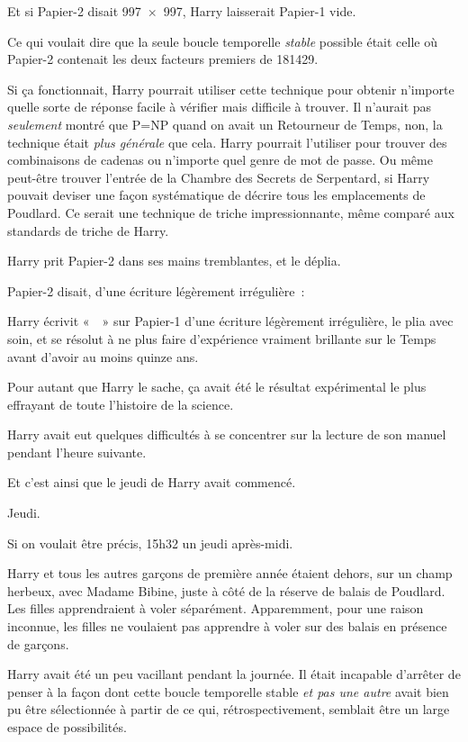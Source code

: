 Et si Papier-2 disait 997~$\times$~997, Harry laisserait Papier-1 vide.

Ce qui voulait dire que la seule boucle temporelle \emph{stable} possible était celle où Papier-2 contenait les deux facteurs premiers de 181429.

Si ça fonctionnait, Harry pourrait utiliser cette technique pour obtenir n'importe quelle sorte de réponse facile à vérifier mais difficile à trouver. Il n'aurait pas \emph{seulement} montré que P=NP quand on avait un Retourneur de Temps, non, la technique était \emph{plus générale} que cela. Harry pourrait l'utiliser pour trouver des combinaisons de cadenas ou n'importe quel genre de mot de passe. Ou même peut-être trouver l'entrée de la Chambre des Secrets de Serpentard, si Harry pouvait deviser une façon systématique de décrire tous les emplacements de Poudlard. Ce serait une technique de triche impressionnante, même comparé aux standards de triche de Harry.

Harry prit Papier-2 dans ses mains tremblantes, et le déplia.

Papier-2 disait, d'une écriture légèrement irrégulière~:


Harry écrivit «~~» sur Papier-1 d'une écriture légèrement irrégulière, le plia avec soin, et se résolut à ne plus faire d'expérience vraiment brillante sur le Temps avant d'avoir au moins quinze ans.

Pour autant que Harry le sache, ça avait été le résultat expérimental le plus effrayant de toute l'histoire de la science.

Harry avait eut quelques difficultés à se concentrer sur la lecture de son manuel pendant l'heure suivante.

Et c'est ainsi que le jeudi de Harry avait commencé.

\later

Jeudi.

Si on voulait être précis, 15h32 un jeudi après-midi.

Harry et tous les autres garçons de première année étaient dehors, sur un champ herbeux, avec Madame Bibine, juste à côté de la réserve de balais de Poudlard. Les filles apprendraient à voler séparément. Apparemment, pour une raison inconnue, les filles ne voulaient pas apprendre à voler sur des balais en présence de garçons.

Harry avait été un peu vacillant pendant la journée. Il était incapable d'arrêter de penser à la façon dont cette boucle temporelle stable \emph{et pas une autre} avait bien pu être sélectionnée à partir de ce qui, rétrospectivement, semblait être un large espace de possibilités.

